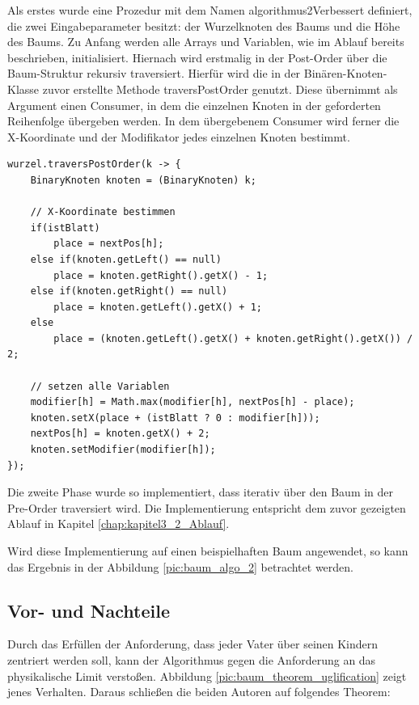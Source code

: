 Als erstes wurde eine Prozedur mit dem Namen \glqq algorithmus2Verbessert\grqq{} 
definiert, die zwei Eingabeparameter besitzt: der Wurzelknoten des Baums 
und die Höhe des Baums. Zu Anfang werden alle Arrays und Variablen, wie im Ablauf 
bereits beschrieben, initialisiert. Hiernach wird erstmalig in der Post-Order über 
die Baum-Struktur rekursiv traversiert. Hierfür wird die in der Binären-Knoten-Klasse 
zuvor erstellte Methode \glqq traversPostOrder\grqq{} genutzt. Diese übernimmt als Argument einen Consumer, 
in dem die einzelnen Knoten in der geforderten Reihenfolge übergeben werden. In dem übergebenem Consumer 
wird ferner die X-Koordinate und der Modifikator jedes einzelnen Knoten bestimmt.

\begin{lstlisting}[caption=Vereinfachte Implementierung der Phase 1, label=code:algo2_phase1]
wurzel.traversPostOrder(k -> {
    BinaryKnoten knoten = (BinaryKnoten) k;

    // X-Koordinate bestimmen
    if(istBlatt)
		place = nextPos[h];
	else if(knoten.getLeft() == null)
		place = knoten.getRight().getX() - 1;
	else if(knoten.getRight() == null)
		place = knoten.getLeft().getX() + 1;
	else
		place = (knoten.getLeft().getX() + knoten.getRight().getX()) / 2;	
    
	// setzen alle Variablen
	modifier[h] = Math.max(modifier[h], nextPos[h] - place);
	knoten.setX(place + (istBlatt ? 0 : modifier[h]));
	nextPos[h] = knoten.getX() + 2;
	knoten.setModifier(modifier[h]);
});
\end{lstlisting}

Die zweite Phase wurde so implementiert, dass iterativ über den Baum in der Pre-Order traversiert 
wird. Die Implementierung entspricht dem zuvor gezeigten Ablauf in Kapitel \ref{chap:kapitel3_2_Ablauf}. 

Wird diese Implementierung auf einen beispielhaften Baum angewendet, so kann das Ergebnis
in der Abbildung \ref{pic:baum_algo_2} betrachtet werden.

\subsection{Vor- und Nachteile}
Durch das Erfüllen der Anforderung, dass jeder Vater über seinen Kindern zentriert werden soll, kann der Algorithmus gegen
die Anforderung an das physikalische Limit verstoßen. 
Abbildung \ref{pic:baum_theorem_uglification} zeigt jenes Verhalten. Daraus schließen die beiden Autoren auf folgendes Theorem:

